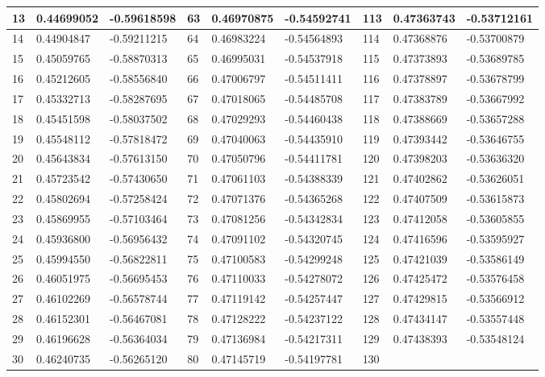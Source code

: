 \begin{table}[h]
\begin{center}
{\begin{tabular}{|l|l|l||l|l|l||l|l|l|}
    13 & 0.44699052 & -0.59618598 & 63 & 0.46970875 & -0.54592741 & 113 &
    0.47363743 & -0.53712161\\\hline
    14 & 0.44904847 & -0.59211215 & 64 & 0.46983224 & -0.54564893 & 114 &
    0.47368876 & -0.53700879\\\hline
    15 & 0.45059765 & -0.58870313 & 65 & 0.46995031 & -0.54537918 & 115 &
    0.47373893 & -0.53689785\\\hline
    16 & 0.45212605 & -0.58556840 & 66 & 0.47006797 & -0.54511411 & 116 &
    0.47378897 & -0.53678799\\\hline
    17 & 0.45332713 & -0.58287695 & 67 & 0.47018065 & -0.54485708 & 117 &
    0.47383789 & -0.53667992\\\hline
    18 & 0.45451598 & -0.58037502 & 68 & 0.47029293 & -0.54460438 & 118 &
    0.47388669 & -0.53657288\\\hline
    19 & 0.45548112 & -0.57818472 & 69 & 0.47040063 & -0.54435910 & 119 &
    0.47393442 & -0.53646755\\\hline
    20 & 0.45643834 & -0.57613150 & 70 & 0.47050796 & -0.54411781 & 120 &
    0.47398203 & -0.53636320\\\hline
    21 & 0.45723542 & -0.57430650 & 71 & 0.47061103 & -0.54388339 & 121 &
    0.47402862 & -0.53626051\\\hline
    22 & 0.45802694 & -0.57258424 & 72 & 0.47071376 & -0.54365268 & 122 &
    0.47407509 & -0.53615873\\\hline
    23 & 0.45869955 & -0.57103464 & 73 & 0.47081256 & -0.54342834 & 123 &
    0.47412058 & -0.53605855\\\hline
    24 & 0.45936800 & -0.56956432 & 74 & 0.47091102 & -0.54320745 & 124 &
    0.47416596 & -0.53595927\\\hline
    25 & 0.45994550 & -0.56822811 & 75 & 0.47100583 & -0.54299248 & 125 &
    0.47421039 & -0.53586149\\\hline
    26 & 0.46051975 & -0.56695453 & 76 & 0.47110033 & -0.54278072 & 126 &
    0.47425472 & -0.53576458\\\hline
    27 & 0.46102269 & -0.56578744 & 77 & 0.47119142 & -0.54257447 & 127 &
    0.47429815 & -0.53566912\\\hline
    28 & 0.46152301 & -0.56467081 & 78 & 0.47128222 & -0.54237122 & 128 &
    0.47434147 & -0.53557448\\\hline
    29 & 0.46196628 & -0.56364034 & 79 & 0.47136984 & -0.54217311 & 129 &
    0.47438393 & -0.53548124\\\hline
    30 & 0.46240735 & -0.56265120 & 80 & 0.47145719 & -0.54197781 & 130 &

\end{tabular}}
\end{center}
\end{table}
